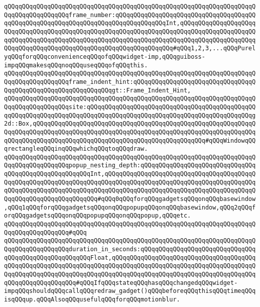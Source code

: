 \verb|qQQqqQQqqQQqqQQqqQQqqQQqqQQqqQQqqQQqqQQqqQQqqQQqqQQqqQQqqQQqqQQqqQQqqQQqqQQqqQQqqQQqqQQqframe_number:qQQqqQQqqQQqqQQqqQQqqQQqqQQqqQQqqQQqqQQqqQQqqQQqqQQqqQQqqQQqqQQqqQQqqQQqqQQqqQQqqQQqInt,qQQqqQQqqQQqqQQqqQQqqQQqqQQqqQQqqQQqqQQqqQQqqQQqqQQqqQQqqQQqqQQqqQQqqQQqqQQqqQQqqQQqqQQqqQQqqQQqqQQqqQQqqQQqqQQqqQQqqQQqqQQqqQQqqQQqqQQqqQQqqQQqqQQqqQQqqQQqqQQqqQQqqQQqqQQqqQQqqQQqqQQqqQQqqQQqqQQqqQQqqQQqqQQq#qQQq1,2,3,...qQQqPurelyqQQqforqQQqconvenienceqQQqofqQQqwidget-imp,qQQqguiboss-impqQQqmakesqQQqnoqQQquseqQQqofqQQqthis.|\newline
\verb|qQQqqQQqqQQqqQQqqQQqqQQqqQQqqQQqqQQqqQQqqQQqqQQqqQQqqQQqqQQqqQQqqQQqqQQqqQQqqQQqqQQqqQQqframe_indent_hint:qQQqqQQqqQQqqQQqqQQqqQQqqQQqqQQqqQQqqQQqqQQqqQQqqQQqqQQqqQQqqQQqgt::Frame_Indent_Hint,|\newline
\verb|qQQqqQQqqQQqqQQqqQQqqQQqqQQqqQQqqQQqqQQqqQQqqQQqqQQqqQQqqQQqqQQqqQQqqQQqqQQqqQQqqQQqqQQqsite:qQQqqQQqqQQqqQQqqQQqqQQqqQQqqQQqqQQqqQQqqQQqqQQqqQQqqQQqqQQqqQQqqQQqqQQqqQQqqQQqqQQqqQQqqQQqqQQqqQQqqQQqqQQqqQQqqQQqg2d::Box,qQQqqQQqqQQqqQQqqQQqqQQqqQQqqQQqqQQqqQQqqQQqqQQqqQQqqQQqqQQqqQQqqQQqqQQqqQQqqQQqqQQqqQQqqQQqqQQqqQQqqQQqqQQqqQQqqQQqqQQqqQQqqQQqqQQqqQQqqQQqqQQqqQQqqQQqqQQqqQQqqQQqqQQqqQQqqQQqqQQqqQQqqQQq#qQQqWindowqQQqrectangleqQQqinqQQqwhichqQQqtoqQQqdraw.|\newline
\verb|qQQqqQQqqQQqqQQqqQQqqQQqqQQqqQQqqQQqqQQqqQQqqQQqqQQqqQQqqQQqqQQqqQQqqQQqqQQqqQQqqQQqqQQqpopup_nesting_depth:qQQqqQQqqQQqqQQqqQQqqQQqqQQqqQQqqQQqqQQqqQQqqQQqqQQqqQQqInt,qQQqqQQqqQQqqQQqqQQqqQQqqQQqqQQqqQQqqQQqqQQqqQQqqQQqqQQqqQQqqQQqqQQqqQQqqQQqqQQqqQQqqQQqqQQqqQQqqQQqqQQqqQQqqQQqqQQqqQQqqQQqqQQqqQQqqQQqqQQqqQQqqQQqqQQqqQQqqQQqqQQqqQQqqQQqqQQqqQQqqQQqqQQqqQQqqQQqqQQqqQQqqQQq#qQQq0qQQqforqQQqgadgetsqQQqonqQQqbasewindow,qQQq1qQQqforqQQqgadgetsqQQqonqQQqpopupqQQqonqQQqbasewindow,qQQq2qQQqforqQQqgadgetsqQQqonqQQqpopupqQQqonqQQqpopup,qQQqetc.|\newline
\verb|qQQqqQQqqQQqqQQqqQQqqQQqqQQqqQQqqQQqqQQqqQQqqQQqqQQqqQQqqQQqqQQqqQQqqQQqqQQqqQQqqQQqqQQq#qQQq|\newline
\verb|qQQqqQQqqQQqqQQqqQQqqQQqqQQqqQQqqQQqqQQqqQQqqQQqqQQqqQQqqQQqqQQqqQQqqQQqqQQqqQQqqQQqqQQqduration_in_seconds:qQQqqQQqqQQqqQQqqQQqqQQqqQQqqQQqqQQqqQQqqQQqqQQqqQQqqQQqFloat,qQQqqQQqqQQqqQQqqQQqqQQqqQQqqQQqqQQqqQQqqQQqqQQqqQQqqQQqqQQqqQQqqQQqqQQqqQQqqQQqqQQqqQQqqQQqqQQqqQQqqQQqqQQqqQQqqQQqqQQqqQQqqQQqqQQqqQQqqQQqqQQqqQQqqQQqqQQqqQQqqQQqqQQqqQQqqQQqqQQqqQQqqQQqqQQqqQQqqQQq#qQQqIfqQQqstateqQQqhasqQQqchangedqQQqwidget-impqQQqshouldqQQqcallqQQqredraw_gadget()qQQqbeforeqQQqthisqQQqtimeqQQqisqQQqup.qQQqAlsoqQQqusefulqQQqforqQQqmotionblur.|\newline

